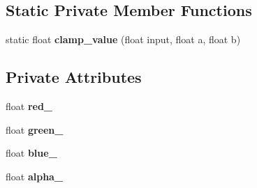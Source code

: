 \subsection*{Static Private Member Functions}
\begin{DoxyCompactItemize}
\item 
static float {\bfseries clamp\+\_\+value} (float input, float a, float b)\hypertarget{classimage__tools_1_1ColorData_ac9c19726be7a97e13b6916ed26822740}{}\label{classimage__tools_1_1ColorData_ac9c19726be7a97e13b6916ed26822740}

\end{DoxyCompactItemize}
\subsection*{Private Attributes}
\begin{DoxyCompactItemize}
\item 
float {\bfseries red\+\_\+}\hypertarget{classimage__tools_1_1ColorData_a78160b930d95c4ece6913717de69d228}{}\label{classimage__tools_1_1ColorData_a78160b930d95c4ece6913717de69d228}

\item 
float {\bfseries green\+\_\+}\hypertarget{classimage__tools_1_1ColorData_aabfb09bb331483211b5b023a6870ea86}{}\label{classimage__tools_1_1ColorData_aabfb09bb331483211b5b023a6870ea86}

\item 
float {\bfseries blue\+\_\+}\hypertarget{classimage__tools_1_1ColorData_a8d44e8cd0701a5cd6fbee7fdb4d01309}{}\label{classimage__tools_1_1ColorData_a8d44e8cd0701a5cd6fbee7fdb4d01309}

\item 
float {\bfseries alpha\+\_\+}\hypertarget{classimage__tools_1_1ColorData_a7bc7d145ee17270baa2d17a03fa17c1e}{}\label{classimage__tools_1_1ColorData_a7bc7d145ee17270baa2d17a03fa17c1e}

\end{DoxyCompactItemize}
